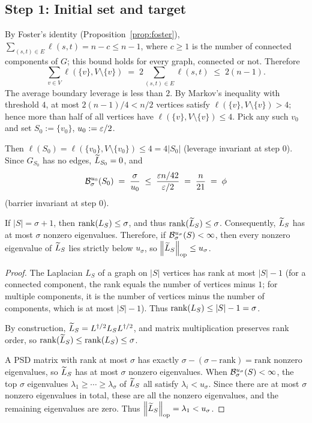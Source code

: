 \subsection*{Step 1: Initial set and target}

By Foster's identity (Proposition~\ref{prop:foster}),
$\sum_{(s,t)\in E}\ell(s,t)=n-c\le n-1$, where $c\ge1$ is the number of connected
components of $G$; this bound holds for every graph, connected or not. Therefore
\[
  \sum_{v\in V}\ell(\{v\},V\setminus\{v\})
   \;=\; 2\!\sum_{(s,t)\in E}\ell(s,t)
   \;\le\; 2(n-1).
\]
The average boundary leverage is less than $2$. By Markov's inequality with
threshold $4$, at most $2(n-1)/4 < n/2$ vertices satisfy
$\ell(\{v\},V\setminus\{v\})>4$; hence more than half of all vertices have
$\ell(\{v\},V\setminus\{v\})\le 4$. Pick any such $v_0$ and set
$S_0:=\{v_0\}$, $u_0:=\varepsilon/2$.

Then $\ell(S_0)=\ell(\{v_0\},V\setminus\{v_0\})\le 4=4|S_0|$
(leverage invariant at step $0$).
Since $G_{S_0}$ has no edges, $\widetilde{L}_{S_0}=0$, and
\[
  \mathcal{B}^{u_0}_{\sigma}(S_0) \;=\; \frac{\sigma}{u_0}
   \;\le\; \frac{\varepsilon n/42}{\varepsilon/2} \;=\; \frac{n}{21} \;=\; \phi
\]
(barrier invariant at step $0$).

\begin{qsixclaim}\label{cl:rank-barrier}
If $|S|=\sigma+1$, then $\operatorname{rank}(L_S) \le \sigma$, and thus $\operatorname{rank}(\widetilde{L}_S) \le \sigma$.
Consequently, $\widetilde{L}_S$ has at most $\sigma$ nonzero eigenvalues. Therefore, if
$\mathcal{B}^{u_\sigma}_{\sigma}(S)<\infty$, then every nonzero eigenvalue of $\widetilde{L}_S$
lies strictly below $u_\sigma$, so $\left\lVert \widetilde{L}_S \right\rVert_{\mathrm{op}}\le u_\sigma$.
\end{qsixclaim}

\begin{proof}
The Laplacian $L_S$ of a graph on $|S|$ vertices has rank at most $|S|-1$ (for a
connected component, the rank equals the number of vertices minus $1$; for
multiple components, it is the number of vertices minus the number of components,
which is at most $|S|-1$). Thus $\operatorname{rank}(L_S)\le|S|-1=\sigma$.

By construction, $\widetilde{L}_S=L^{\dagger/2} L_SL^{\dagger/2}$, and matrix multiplication
preserves rank order, so $\operatorname{rank}(\widetilde{L}_S)\le\operatorname{rank}(L_S)\le\sigma$.

A PSD matrix with rank at most $\sigma$ has exactly $\sigma - (\sigma - \text{rank})
= \text{rank}$ nonzero eigenvalues, so $\widetilde{L}_S$ has at most $\sigma$ nonzero
eigenvalues. When $\mathcal{B}^{u_\sigma}_{\sigma}(S)<\infty$, the top $\sigma$
eigenvalues $\lambda_1\ge\cdots\ge\lambda_\sigma$ of $\widetilde{L}_S$ all satisfy
$\lambda_i < u_\sigma$. Since there are at most $\sigma$ nonzero eigenvalues in
total, these are all the nonzero eigenvalues, and the remaining eigenvalues are
zero. Thus $\left\lVert \widetilde{L}_S \right\rVert_{\mathrm{op}} = \lambda_1 < u_\sigma$.
\end{proof}

